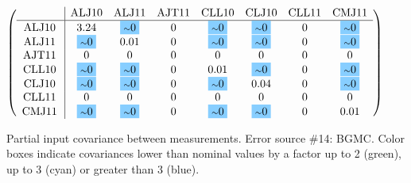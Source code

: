 \begin{table}[H]
\scriptsize
\begin{center}
\renewcommand{\arraystretch}{1.1}
\begin{math}\left(\begin{array}{c|ccccccc}
 & \mathrm{ALJ10} & 
\mathrm{ALJ11} & 
\mathrm{AJT11} & 
\mathrm{CLL10} & 
\mathrm{CLJ10} & 
\mathrm{CLL11} & 
\mathrm{CMJ11} \\
\hline
\mathrm{ALJ10} \hspace*{2pt} &       3.24 &  \colorbox{SkyBlue1}{$ {\scriptstyle \sim }0$} &  0 &  \colorbox{SkyBlue1}{$ {\scriptstyle \sim }0$} &  \colorbox{SkyBlue1}{$ {\scriptstyle \sim }0$} &  0 &  \colorbox{SkyBlue1}{$ {\scriptstyle \sim }0$} \\
\mathrm{ALJ11} \hspace*{2pt} &  \colorbox{SkyBlue1}{$ {\scriptstyle \sim }0$} &       0.01 &  0 &  \colorbox{SkyBlue1}{$ {\scriptstyle \sim }0$} &  \colorbox{SkyBlue1}{$ {\scriptstyle \sim }0$} &  0 &  \colorbox{SkyBlue1}{$ {\scriptstyle \sim }0$} \\
\mathrm{AJT11} \hspace*{2pt} &  0 &  0 &  0 &  0 &  0 &  0 &  0 \\
\mathrm{CLL10} \hspace*{2pt} &  \colorbox{SkyBlue1}{$ {\scriptstyle \sim }0$} &  \colorbox{SkyBlue1}{$ {\scriptstyle \sim }0$} &  0 &       0.01 &  \colorbox{SkyBlue1}{$ {\scriptstyle \sim }0$} &  0 &  \colorbox{SkyBlue1}{$ {\scriptstyle \sim }0$} \\
\mathrm{CLJ10} \hspace*{2pt} &  \colorbox{SkyBlue1}{$ {\scriptstyle \sim }0$} &  \colorbox{SkyBlue1}{$ {\scriptstyle \sim }0$} &  0 &  \colorbox{SkyBlue1}{$ {\scriptstyle \sim }0$} &       0.04 &  0 &  \colorbox{SkyBlue1}{$ {\scriptstyle \sim }0$} \\
\mathrm{CLL11} \hspace*{2pt} &  0 &  0 &  0 &  0 &  0 &  0 &  0 \\
\mathrm{CMJ11} \hspace*{2pt} &  \colorbox{SkyBlue1}{$ {\scriptstyle \sim }0$} &  \colorbox{SkyBlue1}{$ {\scriptstyle \sim }0$} &  0 &  \colorbox{SkyBlue1}{$ {\scriptstyle \sim }0$} &  \colorbox{SkyBlue1}{$ {\scriptstyle \sim }0$} &  0 &       0.01 \\
\end{array}\right)\end{math}
\caption{Partial input covariance between measurements. Error source \#14: BGMC. Color boxes indicate covariances lower than nominal values by a factor up to 2 (green), up to 3 (cyan) or greater than 3 (blue).}
\renewcommand{\arraystretch}{1}
\end{center}
\end{table}
